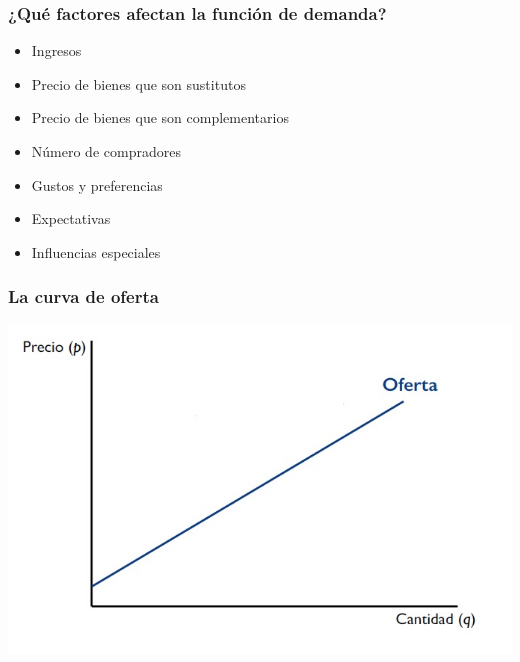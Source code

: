\documentclass{beamer}
\begin{document}
\begin{frame}
\frametitle{¿Qué factores afectan la función de demanda?}
\begin{itemize}
    \item Ingresos %
    \item Precio de bienes que son sustitutos %
    \item Precio de bienes que son complementarios %
    \item Número de compradores %
    \item Gustos y preferencias %
    \item Expectativas %
    \item Influencias especiales %
\end{itemize}
\end{frame}





\begin{frame}
\frametitle{La curva de oferta}
\includegraphics[scale=0.6]{../Figures/Tema_07.2_curvadeoferta.jpg}
\end{frame}
\end{document}

